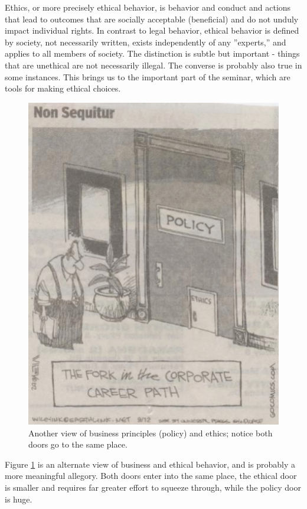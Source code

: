 Ethics, or more precisely ethical behavior, is behavior and conduct and actions that lead to outcomes that are socially acceptable (beneficial) and do not unduly impact individual rights.  In contrast to legal behavior, ethical behavior is defined by society, not necessarily written, exists independently of any ''experts,'' and applies to all members of society.  The distinction is subtle but important - things that are unethical are not necessarily illegal.  The converse is probably also true in some instances.  This brings us to the important part of the seminar, which are tools for making ethical choices.

\begin{figure}[ht!] %
   \centering
   \includegraphics[width=5in]{./figures/ethics_or_business.pdf} 
   \caption{Another view of business principles (policy) and ethics; notice both doors go to the same place.}
   \label{fig:ethics_or_business}
\end{figure}

Figure  \ref{fig:ethics_or_business} is an alternate view of business and ethical behavior, and is probably a more meaningful allegory.  Both doors enter into the same place, the ethical door is smaller and requires far greater effort to squeeze through, while the policy door is huge.